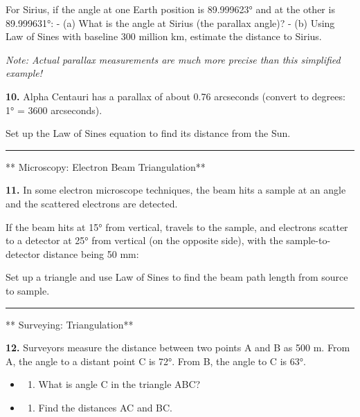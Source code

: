 \documentclass[
  11pt,
]{article}
\providecommand{\tightlist}{%
  \setlength{\itemsep}{0pt}\setlength{\parskip}{0pt}}
\begin{document}
For Sirius, if the angle at one Earth position is 89.999623° and at the
other is 89.999631°: - (a) What is the angle at Sirius (the parallax
angle)? - (b) Using Law of Sines with baseline 300 million km, estimate
the distance to Sirius.

\emph{Note: Actual parallax measurements are much more precise than this
simplified example!}

\textbf{10.} Alpha Centauri has a parallax of about 0.76 arcseconds
(convert to degrees: 1° = 3600 arcseconds).

Set up the Law of Sines equation to find its distance from the Sun.

\begin{center}\rule{0.5\linewidth}{0.5pt}\end{center}

** Microscopy: Electron Beam Triangulation**

\textbf{11.} In some electron microscope techniques, the beam hits a
sample at an angle and the scattered electrons are detected.

If the beam hits at 15° from vertical, travels to the sample, and
electrons scatter to a detector at 25° from vertical (on the opposite
side), with the sample-to-detector distance being 50 mm:

Set up a triangle and use Law of Sines to find the beam path length from
source to sample.

\begin{center}\rule{0.5\linewidth}{0.5pt}\end{center}

** Surveying: Triangulation**

\textbf{12.} Surveyors measure the distance between two points A and B
as 500 m. From A, the angle to a distant point C is 72°. From B, the
angle to C is 63°.

\begin{itemize}
\item
  \begin{enumerate}
  \def\labelenumi{(\alph{enumi})}
  \tightlist
  \item
    What is angle C in the triangle ABC?
  \end{enumerate}
\item
  \begin{enumerate}
  \def\labelenumi{(\alph{enumi})}
  \setcounter{enumi}{1}
  \tightlist
  \item
    Find the distances AC and BC.
  \end{enumerate}
\end{itemize}
\end{document}
